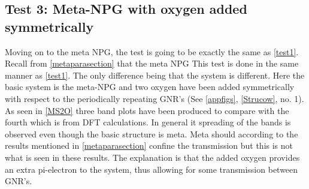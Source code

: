 \subsection{Test 3: Meta-NPG with oxygen added symmetrically}\label{test3}
Moving on to the meta NPG, the test is going to be exactly the same as \cref{test1}. Recall from \cref{metaparasection} that the meta NPG This test is done in the same manner as \cref{test1}. The only difference being that the system is different. Here the basic system is the meta-NPG and two oxygen have been added symmetrically with respect to the periodically repeating GNR's (See \cref{appfigs}, \cref{Strucow}, no. 1). As seen in \cref{MS2O} three band plots have been produced to compare with the fourth which is from DFT calculations. In general it spreading of the bands is observed even though the basic structure is meta. Meta should according to the results mentioned in \cref{metaparasection} confine the transmission but this is not what is seen in these results. The explanation is that the added oxygen provides an extra pi-electron to the system, thus allowing for some transmission between GNR's.
